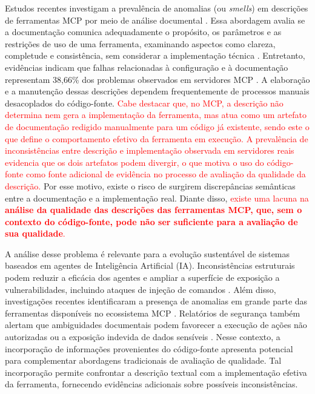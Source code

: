 Estudos recentes investigam a prevalência de anomalias (ou \textit{smells}) em descrições de ferramentas MCP por meio de análise documental \textcolor{red}{\cite{2026arXiv260214878M}}. Essa abordagem avalia se a documentação comunica adequadamente o propósito, os parâmetros e as restrições de uso de uma ferramenta, examinando aspectos como clareza, completude e consistência, sem considerar a implementação técnica \cite{mcpAtFirstGlance}. Entretanto, evidências indicam que falhas relacionadas à configuração e à documentação representam 38,66\% dos problemas observados em servidores MCP \cite{Taraghi2026}. A elaboração e a manutenção dessas descrições dependem frequentemente de processos manuais desacoplados do código-fonte. \textcolor{red}{Cabe destacar que, no MCP, a descrição não determina nem gera a implementação da ferramenta, mas atua como um artefato de documentação redigido manualmente para um código já existente, sendo este o que define o comportamento efetivo da ferramenta em execução. A prevalência de inconsistências entre descrição e implementação observada em servidores reais \cite{shi2026description} evidencia que os dois artefatos podem divergir, o que motiva o uso do código-fonte como fonte adicional de evidência no processo de avaliação da qualidade da descrição.} Por esse motivo, existe o risco de surgirem discrepâncias semânticas entre a documentação e a implementação real. Diante disso, \textcolor{red}{existe uma lacuna na \textbf{análise da qualidade das descrições das ferramentas MCP, que, sem o contexto do código-fonte, pode não ser suficiente para a avaliação de sua qualidade}.}

A análise desse problema é relevante para a evolução sustentável de sistemas baseados em agentes de Inteligência Artificial (IA). Inconsistências estruturais podem reduzir a eficácia dos agentes e ampliar a superfície de exposição a vulnerabilidades, incluindo ataques de injeção de comandos \cite{Taraghi2026}. Além disso, investigações recentes identificaram a presença de anomalias em grande parte das ferramentas disponíveis no ecossistema MCP \cite{mcpAtFirstGlance}. Relatórios de segurança também alertam que ambiguidades documentais podem favorecer a execução de ações não autorizadas ou a exposição indevida de dados sensíveis \cite{NSA2026}. Nesse contexto, a incorporação de informações provenientes do código-fonte apresenta potencial para complementar abordagens tradicionais de avaliação de qualidade. Tal incorporação permite confrontar a descrição textual com a implementação efetiva da ferramenta, fornecendo evidências adicionais sobre possíveis inconsistências.

